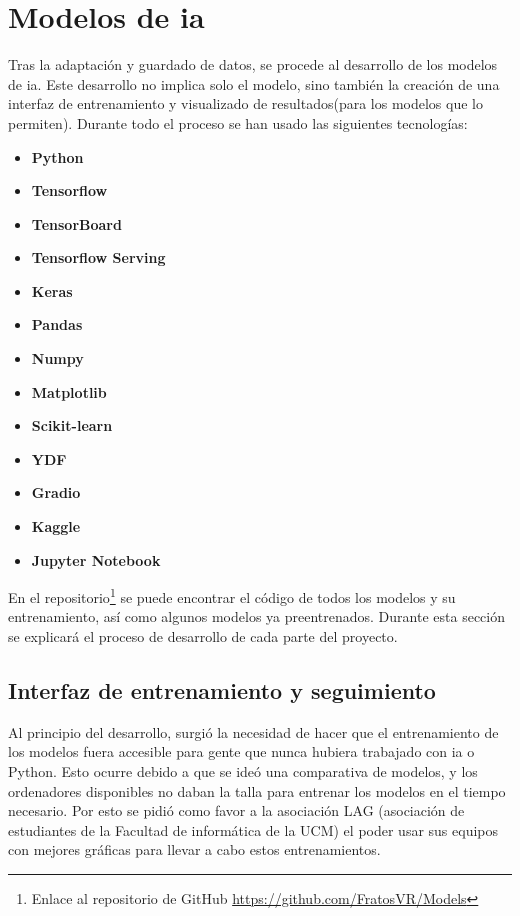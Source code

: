 \section{Modelos de \gls{ia}}

Tras la adaptación y guardado de datos, se procede al desarrollo de los modelos de \gls{ia}. Este desarrollo no implica solo el modelo, sino también la creación de una interfaz de entrenamiento y visualizado de resultados(para los modelos que lo permiten). Durante todo el proceso se han usado las siguientes tecnologías:
\begin{itemize}
    \item \textbf{Python}
    \item \textbf{Tensorflow}
    \item \textbf{TensorBoard}
    \item \textbf{Tensorflow Serving}
    \item \textbf{Keras}
    \item \textbf{Pandas}
    \item \textbf{Numpy}
    \item \textbf{Matplotlib}
    \item \textbf{Scikit-learn}
    \item \textbf{YDF}
    \item \textbf{Gradio}
    \item \textbf{Kaggle}
    \item \textbf{Jupyter Notebook}
\end{itemize}

En el repositorio\footnote{Enlace al repositorio de GitHub \url{https://github.com/FratosVR/Models}} se puede encontrar el código de todos los modelos y su entrenamiento, así como algunos modelos ya preentrenados. Durante esta sección se explicará el proceso de desarrollo de cada parte del proyecto.

\subsection{Interfaz de entrenamiento y seguimiento}

Al principio del desarrollo, surgió la necesidad de hacer que el entrenamiento de los modelos fuera accesible para gente que nunca hubiera trabajado con \gls{ia} o Python. Esto ocurre debido a que se ideó una comparativa de modelos, y los ordenadores disponibles no daban la talla para entrenar los modelos en el tiempo necesario. Por esto se pidió como favor a la asociación LAG (asociación de estudiantes de la Facultad de informática de la UCM) el poder usar sus equipos con mejores gráficas para llevar a cabo estos entrenamientos.

